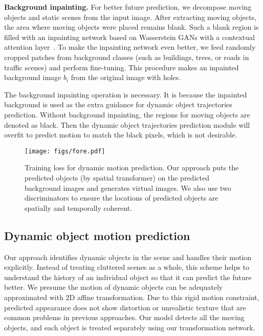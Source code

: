 \documentclass[10pt,twocolumn,letterpaper]{article}
\begin{document}
\vspace{2mm}
\noindent\textbf{Background inpainting.}
For better future prediction, we decompose moving objects and static scenes from the input image. After extracting moving objects, the area where moving objects were placed remains blank. Such a blank region is filled with an inpainting network based on Wasserstein GANs with a contextual attention layer~\cite{yu2018generative}. To make the inpainting network even better, we feed randomly cropped patches from background classes (such as buildings, trees, or roads in traffic scenes) and perform fine-tuning. This procedure makes an inpainted background image $b_i$ from the original image with holes.

The background inpainting operation is necessary. It is because the inpainted background is used as the extra guidance for dynamic object trajectories prediction. Without background inpainting, the regions for moving objects are denoted as black. Then the dynamic object trajectories prediction module will overfit to predict motion to match the black pixels, which is not desirable.



\begin{figure}[t!]
\centering
\hspace{-2mm}
\texttt{[image: figs/fore.pdf]}
\vspace{1mm}
\caption{
Training loss for dynamic motion prediction. Our approach puts the predicted objects (by spatial transformer) on the predicted background images and generates virtual images. We also use two discriminators to ensure the locations of predicted objects are spatially and temporally coherent.
}
\label{fig:fore}
\end{figure}

\subsection{Dynamic object motion prediction}
Our approach identifies dynamic objects in the scene and handles their motion explicitly. Instead of treating cluttered scenes as a whole, this scheme helps to understand the history of an individual object so that it can predict the future better. We presume the motion of dynamic objects can be adequately approximated with 2D affine transformation. Due to this rigid motion constraint, predicted appearance does not show distortion or unrealistic texture that are common problems in previous approaches. Our model detects all the moving objects, and each object is treated separately using our transformation network.
\end{document}
